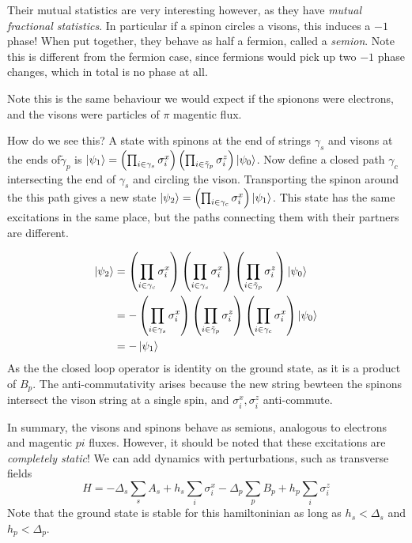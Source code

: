 \documentclass[a4paper]{article}
\begin{document}
Their mutual statistics are very interesting however, as they have \emph{mutual
fractional statistics}. In particular if a spinon circles a visons, this induces
a $-1$ phase! When put together, they behave as half a fermion, called
a \emph{semion}.  Note this is different from the fermion case, since fermions
would pick up two $-1$ phase changes, which in total is no phase at all.

Note this is the same behaviour we would expect if the spionons were electrons,
and the visons were particles of $\pi$ magentic flux.

How do we see this? A state with spinons at the end of strings $\gamma_s$
and visons at the ends of$\tilde{\gamma}_p$ is $\ket{\psi_1}=\left(\prod_{i\in \gamma_s}
\sigma_i^x\right)\left(\prod_{i\in\tilde{\gamma}_p}
\sigma_i^z\right)\ket{\psi_0}$.
Now define a closed path $\gamma_c$ intersecting the end of $\gamma_s$ and circling the
vison. Transporting the spinon around the this path gives a new state
$\ket{\psi_2}=\left(\prod_{i\in \gamma_c} \sigma_i^x\right)\ket{\psi_1}$. This
state has the same excitations in the same place, but the paths connecting them
with their partners are different.

\begin{align*}
    \ket{\psi_2} &=\left(\prod_{i\in \gamma_c} \sigma_i^x\right)\left(\prod_{i\in \gamma_s}
\sigma_i^x\right)\left(\prod_{i\in \tilde{\gamma}_p} \sigma_i^z\right) \ket{\psi_0}\\
                 &=- \left(\prod_{i\in \gamma_s}
                     \sigma_i^x\right)\left(\prod_{i\in \tilde{\gamma}_p}
\sigma_i^z\right)\left(\prod_{i\in \gamma_c} \sigma_i^x\right) \ket{\psi_0}\\
                 &=-\ket{\psi_1}
\end{align*}
As the the closed loop operator is identity on the ground state, as it is a product of
$B_p$. The anti-commutativity
arises because the new string bewteen the spinons intersect the vison string at
a single spin, and $\sigma^x_i,\sigma_i^z$ anti-commute.

In summary, the visons and spinons behave as semions, analogous to electrons and
magentic $pi$ fluxes. However, it should be noted that these excitations are
\emph{completely static}! We can add dynamics with perturbations, such as transverse fields
\[ 
    H=-\Delta_s\sum_sA_s + h_s\sum_i\sigma_i^x -\Delta_p\sum_p B_p +h_p\sum_i \sigma_i^z
\]
Note that the ground state is stable for this hamiltoninian as long as
$h_s<\Delta_s$ and $h_p<\Delta_p$.
\end{document}
